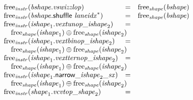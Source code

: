 $$\begin{array}[t]{@{}lcl@{}l@{}}
{\mathrm{free}}_{\mathit{instr}}({\mathit{bshape}} {.} {\mathit{vswizzlop}}) & = & {\mathrm{free}}_{\mathit{shape}}({\mathit{bshape}}) \\
{\mathrm{free}}_{\mathit{instr}}({\mathit{bshape}}{.}\mathsf{shuffle}~{{\mathit{laneidx}}^\ast}) & = & {\mathrm{free}}_{\mathit{shape}}({\mathit{bshape}}) \\
{\mathrm{free}}_{\mathit{instr}}({\mathit{ishape}}_1 {.} {{\mathit{vextunop}}}{\mathsf{\_}}{{\mathit{ishape}}_2}) & = & & \\
 \multicolumn{4}{@{}l@{}}{\quad
\begin{array}[t]{@{}l@{}}
{\mathrm{free}}_{\mathit{shape}}({\mathit{ishape}}_1) \oplus {\mathrm{free}}_{\mathit{shape}}({\mathit{ishape}}_2) \\
\end{array}
} \\
{\mathrm{free}}_{\mathit{instr}}({\mathit{ishape}}_1 {.} {{\mathit{vextbinop}}}{\mathsf{\_}}{{\mathit{ishape}}_2}) & = & & \\
 \multicolumn{4}{@{}l@{}}{\quad
\begin{array}[t]{@{}l@{}}
{\mathrm{free}}_{\mathit{shape}}({\mathit{ishape}}_1) \oplus {\mathrm{free}}_{\mathit{shape}}({\mathit{ishape}}_2) \\
\end{array}
} \\
{\mathrm{free}}_{\mathit{instr}}({\mathit{ishape}}_1 {.} {{\mathit{vextternop}}}{\mathsf{\_}}{{\mathit{ishape}}_2}) & = & & \\
 \multicolumn{4}{@{}l@{}}{\quad
\begin{array}[t]{@{}l@{}}
{\mathrm{free}}_{\mathit{shape}}({\mathit{ishape}}_1) \oplus {\mathrm{free}}_{\mathit{shape}}({\mathit{ishape}}_2) \\
\end{array}
} \\
{\mathrm{free}}_{\mathit{instr}}({{\mathit{ishape}}_1{.}\mathsf{narrow}}{\mathsf{\_}}{{\mathit{ishape}}_2}{\mathsf{\_}}{{\mathit{sx}}}) & = & & \\
 \multicolumn{4}{@{}l@{}}{\quad
\begin{array}[t]{@{}l@{}}
{\mathrm{free}}_{\mathit{shape}}({\mathit{ishape}}_1) \oplus {\mathrm{free}}_{\mathit{shape}}({\mathit{ishape}}_2) \\
\end{array}
} \\
{\mathrm{free}}_{\mathit{instr}}({\mathit{shape}}_1 {.} {{\mathit{vcvtop}}}{\mathsf{\_}}{{\mathit{shape}}_2}) & = & & \\

\end{array}$$
